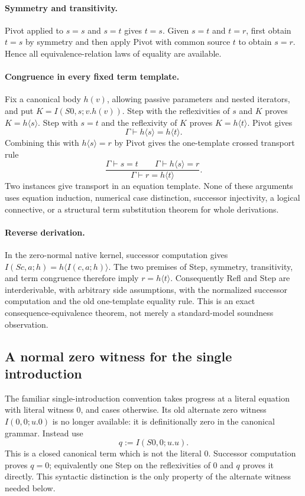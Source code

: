 \documentclass[11pt,letterpaper]{article}
\theoremstyle{definition}
\begin{document}
\paragraph{Symmetry and transitivity.}
Pivot applied to $s=s$ and $s=t$ gives $t=s$. Given $s=t$ and $t=r$,
first obtain $t=s$ by symmetry and then apply Pivot with common source
$t$ to obtain $s=r$. Hence all equivalence-relation laws of equality
are available.

\paragraph{Congruence in every fixed term template.}
Fix a canonical body $h(v)$, allowing passive parameters and nested
iterators, and put $K=I(S0,s;v.h(v))$. Step with the reflexivities of
$s$ and $K$ proves $K=h\langle s\rangle$. Step with $s=t$ and the
reflexivity of $K$ proves $K=h\langle t\rangle$. Pivot gives
\[
 \Gamma\vdash h\langle s\rangle=h\langle t\rangle.
\]
Combining this with $h\langle s\rangle=r$ by Pivot gives the
one-template crossed transport rule
\[
 \frac{\Gamma\vdash s=t\qquad
       \Gamma\vdash h\langle s\rangle=r}
      {\Gamma\vdash r=h\langle t\rangle}.
 \tag{Tr}\label{rule:recovered-tr}
\]
Two instances give transport in an equation template. None of these
arguments uses equation induction, numerical case distinction,
successor injectivity, a logical connective, or a structural term
substitution theorem for whole derivations.

\paragraph{Reverse derivation.}
In the zero-normal native kernel, successor computation gives
$I(Sc,a;h)=h\langle I(c,a;h)\rangle$. The two premises of Step,
symmetry, transitivity, and term congruence therefore imply
$r=h\langle t\rangle$. Consequently Refl and Step are interderivable,
with arbitrary side assumptions, with the normalized successor
computation and the old one-template equality rule. This is an exact
consequence-equivalence theorem, not merely a standard-model soundness
observation.

\subsection{A normal zero witness for the single introduction}

The familiar single-introduction convention takes progress at a literal
equation with literal witness $0$, and cases otherwise. Its old alternate
zero witness $I(0,0;u.0)$ is no longer available: it is definitionally
zero in the canonical grammar. Instead use
\[
 q:=I(S0,0;u.u).
\]
This is a closed canonical term which is not the literal $0$.
Successor computation proves $q=0$; equivalently one Step on the
reflexivities of $0$ and $q$ proves it directly. This syntactic distinction
is the only property of the alternate witness needed below.
\end{document}
